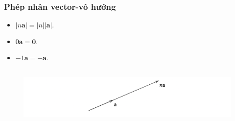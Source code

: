\begin{frame}
    \frametitle{Phép nhân vector-vô hướng}
    \begin{itemize}
        \item \(\lvert n\mathbf{a}\rvert =\lvert n\rvert \lvert \mathbf{a}\rvert .\)
        \item \(0\mathbf{a}=\mathbf{0}\).
        \item \(-1\mathbf{a}=-\mathbf{a}\).
    \end{itemize}
    \begin{figure}[H]
        \centering
        \includegraphics[width=12cm, height=3cm]{Slides/Figure/vector x vo huong.png}
    \end{figure}
\end{frame}
